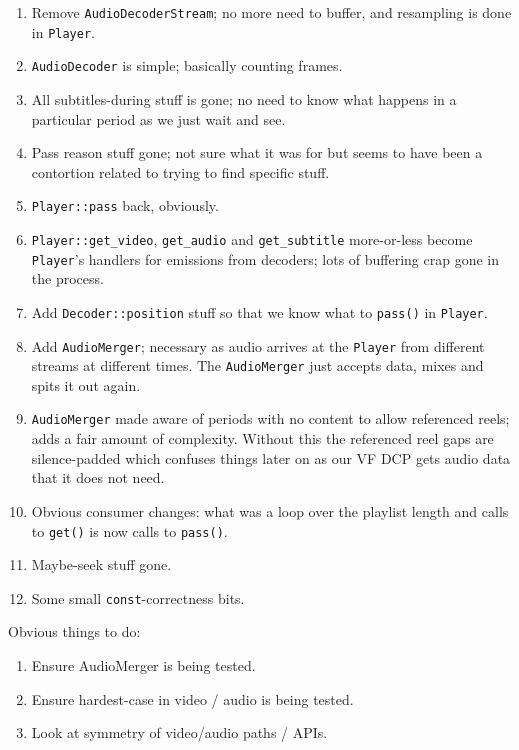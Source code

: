 \documentclass{article}
\begin{document}
\begin{enumerate}
\item Remove \texttt{AudioDecoderStream}; no more need to buffer, and resampling is done in \texttt{Player}.
\item \texttt{AudioDecoder} is simple; basically counting frames.
\item All subtitles-during stuff is gone; no need to know what happens in a particular period as we just wait and see.
\item Pass reason stuff gone; not sure what it was for but seems to have been a contortion related to trying to find specific stuff.
  \item \texttt{Player::pass} back, obviously.
  \item \texttt{Player::get\_video}, \texttt{get\_audio} and
    \texttt{get\_subtitle} more-or-less become \texttt{Player}'s
    handlers for emissions from decoders; lots of buffering crap gone
    in the process.
  \item Add \texttt{Decoder::position} stuff so that we know what to \texttt{pass()} in \texttt{Player}.
  \item Add \texttt{AudioMerger}; necessary as audio arrives at the
    \texttt{Player} from different streams at different times.  The
    \texttt{AudioMerger} just accepts data, mixes and spits it out
    again.
\item \texttt{AudioMerger} made aware of periods with no content to
  allow referenced reels; adds a fair amount of complexity.  Without
  this the referenced reel gaps are silence-padded which confuses
  things later on as our VF DCP gets audio data that it does not need.
\item Obvious consumer changes: what was a loop over the playlist
  length and calls to \texttt{get()} is now calls to \texttt{pass()}.
  \item Maybe-seek stuff gone.
  \item Some small \texttt{const}-correctness bits.
\end{enumerate}

Obvious things to do:

\begin{enumerate}
\item Ensure AudioMerger is being tested.
\item Ensure hardest-case in video / audio is being tested.
\item Look at symmetry of video/audio paths / APIs.
\end{enumerate}
\end{document}
